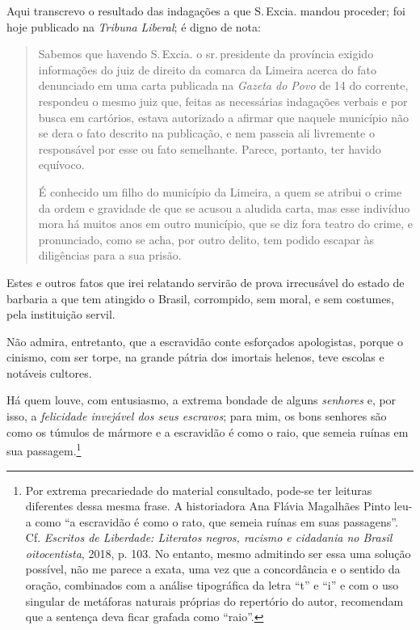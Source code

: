 Aqui transcrevo o resultado das indagações a que S.\,Excia. mandou
proceder; foi hoje publicado na \emph{Tribuna} \emph{Liberal}; é digno
de nota:

\begin{quote}
Sabemos que havendo S.\,Excia. o sr.\,presidente da província exigido
informações do juiz de direito da comarca da Limeira acerca do
fato denunciado em uma carta publicada na \emph{Gazeta do Povo} de 14 do
corrente, respondeu o mesmo juiz que, feitas as necessárias indagações
verbais e por busca em cartórios, estava autorizado a afirmar que
naquele município não se dera o fato descrito na publicação, e nem
passeia ali livremente o responsável por esse ou fato semelhante.
Parece, portanto, ter havido equívoco.

É conhecido um filho do município da Limeira, a quem se atribui o crime
da ordem e gravidade de que se acusou a aludida carta, mas esse
indivíduo mora há muitos anos em outro município, que se diz fora teatro
do crime, e pronunciado, como se acha, por outro delito, tem podido
escapar às diligências para a sua prisão.
\end{quote}

Estes e outros fatos que irei relatando servirão de prova irrecusável do
estado de barbaria a que tem atingido o Brasil, corrompido, sem moral, e
sem costumes, pela instituição servil.

Não admira, entretanto, que a escravidão conte esforçados apologistas,
porque o cinismo, com ser torpe, na grande pátria dos imortais helenos,
teve escolas e notáveis cultores.

Há quem louve, com entusiasmo, a extrema bondade de alguns
\emph{senhores} e, por isso, a \emph{felicidade invejável dos seus
escravos}; para mim, os bons senhores são como os túmulos de mármore e a
escravidão é como o raio, que semeia ruínas em sua passagem.\footnote{
  Por extrema precariedade do material consultado, pode-se ter leituras
  diferentes dessa mesma frase. A historiadora Ana Flávia Magalhães
  Pinto leu-a como ``a escravidão é como o rato, que semeia ruínas em
  suas passagens''. Cf. \emph{Escritos de Liberdade: Literatos negros,
  racismo e cidadania no Brasil oitocentista}, 2018, p. 103. No entanto,
mesmo admitindo ser essa uma solução possível, não me parece a exata,
uma vez que a concordância e o sentido da oração, combinados com a análise tipográfica da letra ``t'' e
  ``i'' e com o uso singular de metáforas naturais
  próprias do repertório do autor, recomendam que a sentença deva ficar
  grafada como ``raio''.}

